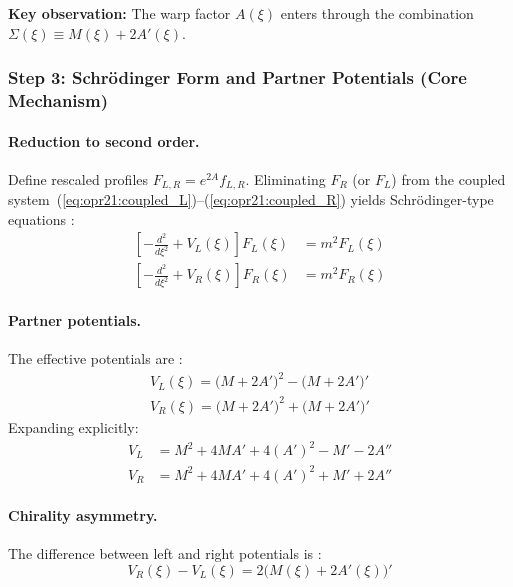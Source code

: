 \textbf{Key observation:} The warp factor $A(\xi)$ enters through the combination
$\Sigma(\xi) \equiv M(\xi) + 2A'(\xi)$.

\subsubsection{Step 3: Schr\"odinger Form and Partner Potentials (Core Mechanism)}
\label{subsubsec:opr21_step3}

\paragraph{Reduction to second order.}
Define rescaled profiles $F_{L,R} = e^{2A} f_{L,R}$. Eliminating $F_R$ (or $F_L$)
from the coupled system~(\ref{eq:opr21:coupled_L})--(\ref{eq:opr21:coupled_R})
yields Schr\"odinger-type equations \tagDc{}:
\begin{align}
    \left[-\frac{d^2}{d\xi^2} + V_L(\xi)\right] F_L(\xi) &= m^2 F_L(\xi)
    \label{eq:opr21:schrodinger_L} \\
    \left[-\frac{d^2}{d\xi^2} + V_R(\xi)\right] F_R(\xi) &= m^2 F_R(\xi)
    \label{eq:opr21:schrodinger_R}
\end{align}

\paragraph{Partner potentials.}
The effective potentials are \tagDc{}:
\begin{align}
    \boxed{V_L(\xi) = \bigl(M + 2A'\bigr)^2 - \bigl(M + 2A'\bigr)'}
    \label{eq:opr21:VL} \\[6pt]
    \boxed{V_R(\xi) = \bigl(M + 2A'\bigr)^2 + \bigl(M + 2A'\bigr)'}
    \label{eq:opr21:VR}
\end{align}
Expanding explicitly:
\begin{align}
    V_L &= M^2 + 4MA' + 4(A')^2 - M' - 2A'' \\
    V_R &= M^2 + 4MA' + 4(A')^2 + M' + 2A''
\end{align}

\paragraph{Chirality asymmetry.}
The difference between left and right potentials is \tagDc{}:
\begin{equation}
    \boxed{
    V_R(\xi) - V_L(\xi) = 2\bigl(M(\xi) + 2A'(\xi)\bigr)'
    }
    \label{eq:opr21:chirality_gap}
\end{equation}

